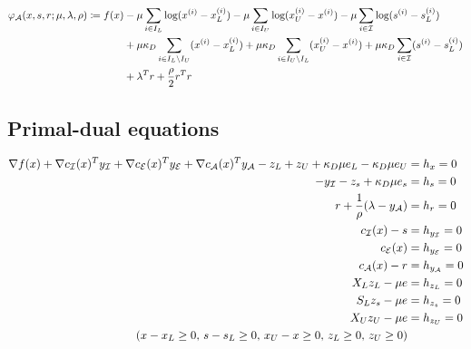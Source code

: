 \documentclass[10pt]{article}
\begin{document}
	\begin{equation}
		\begin{aligned}
		\varphi_{\mathcal A}(x,s,r; \mu,\lambda,\rho) \coloneqq f(x) &- \mu \sum_{i \in I_L} \text{log}(x^{(i)} - x^{(i)}_L) - \mu \sum_{i \in I_U} \text{log}(x^{(i)}_U - x^{(i)}) -\mu \sum_{i \in \mathcal I} \text{log}(s^{(i)} - s_L^{(i)}) \\
		& + \mu\kappa_D \sum_{i \in I_L \backslash I_U} (x^{(i)} - x^{(i)}_L)
		+ \mu\kappa_D \sum_{i \in I_U \backslash I_L} (x_U^{(i)} - x^{(i)})
		+ \mu\kappa_D \sum_{i \in \mathcal I} (s^{(i)} - s_L^{(i)})\\
		& + \lambda^T r + \frac{\rho}{2}r^T r \notag
		\end{aligned}
	\end{equation}
	
\subsection*{Primal-dual equations}
	\begin{equation}
		\begin{aligned}
			\nabla f(x) + \nabla c_{\mathcal I}(x)^T y_{\mathcal I} + \nabla c_{\mathcal E}(x)^T y_{\mathcal E} + \nabla c_{\mathcal A}(x)^T y_{\mathcal A} - z_L + z_U + \kappa_D \mu e_{L} - \kappa_D \mu e_{U} &= h_x = 0 \\
			-y_{\mathcal I} - z_s + \kappa_D \mu e_s &= h_s = 0\\
			r + \frac{1}{\rho}(\lambda - y_{\mathcal A}) &= h_r = 0 \\
			c_{\mathcal I}(x) - s &= h_{y_{\mathcal I}} = 0 \\
			c_{\mathcal E}(x) &= h_{y_{\mathcal E}} = 0 \\
			c_{\mathcal A}(x) -r &= h_{y_{\mathcal A}} = 0 \\
			X_L z_L - \mu e &= h_{z_L} = 0 \\
			S_Lz_s - \mu e &= h_{z_s} = 0 \\
			X_U z_U - \mu e &= h_{z_U} = 0 \\
			(x-x_L \geq 0,\,s -s_L \geq 0,\, x_U - x \geq 0,\, z_L \geq 0,\, z_U \geq 0)
		\end{aligned} \notag
	\end{equation}

	
\end{document}
